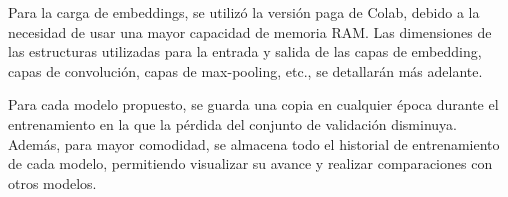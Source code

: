 Para la carga de embeddings, se utilizó la versión paga de Colab, debido a la necesidad de usar una mayor capacidad de memoria RAM. Las dimensiones de las estructuras utilizadas para la entrada y salida de las capas de embedding, capas de convolución, capas de max-pooling, etc., se detallarán más adelante.

Para cada modelo propuesto, se guarda una copia en cualquier época durante el entrenamiento en la que la pérdida del conjunto de validación disminuya. Además, para mayor comodidad, se almacena todo el historial de entrenamiento de cada modelo, permitiendo visualizar su avance y realizar comparaciones con otros modelos.
